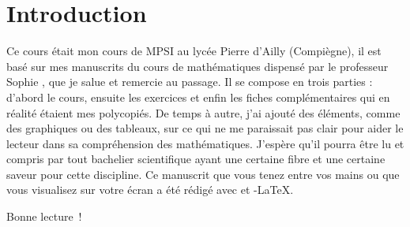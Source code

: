 \chapter*{Introduction}

Ce cours était mon cours de MPSI au lycée Pierre d'Ailly (Compiègne), il est basé sur mes manuscrits du cours de mathématiques dispensé par le professeur Sophie , que je salue et remercie au passage. Il se compose en trois parties : d'abord le cours, ensuite les exercices et enfin les fiches complémentaires qui en réalité étaient mes polycopiés. De temps à autre, j'ai ajouté des éléments, comme des graphiques ou des tableaux, sur ce qui ne me paraissait pas clair pour aider le lecteur dans sa compréhension des mathématiques. J'espère qu'il pourra être lu et compris par tout bachelier scientifique ayant une certaine fibre et une certaine saveur pour cette discipline. Ce manuscrit que vous tenez entre vos mains ou que vous visualisez sur votre écran a été rédigé avec \LaTeXe{} et \AmS-\LaTeX{}.

Bonne lecture~!
